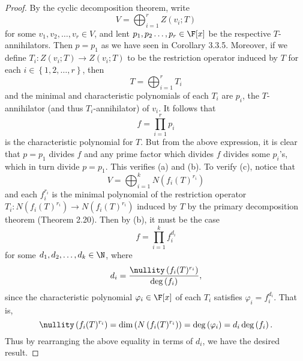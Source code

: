 \documentclass[math_245.tex]{subfiles}
\begin{document}
    \begin{proof}
        By the cyclic decomposition theorem, write
        \begin{equation*}
            V = \bigoplus^{r}_{i=1} Z(v_i;T)
        \end{equation*}
        for some $v_1,v_2,\ldots,v_r\in V$, and lent $p_1,p_2\ldots,p_r\in\F[x]$ be the respective $T$-annihilators. Then $p=p_1$ as we have seen in Corollary 3.3.5. Moreover, if we define $T_i:Z\left( v_i;T \right) \to Z\left( v_i;T \right)$ to be the restriction operator induced by $T$ for each $i\in \left\lbrace 1,2,\ldots,r \right\rbrace $, then
        \begin{equation*}
            T = \bigoplus^{r}_{i=1} T_i
        \end{equation*}
        and the minimal and characteristic polynomials of each $T_i$ are $p_i$, the $T$-annihilator (and thus $T_i$-annihilator) of $v_i$. It follows that
        \begin{equation*}
            f = \prod^{r}_{i=1} p_i
        \end{equation*}
        is the characteristic polynomial for $T$. But from the above expression, it is clear that $p=p_1$ divides $f$ and any prime factor which divides $f$ divides some $p_i$'s, which in turn divide $p=p_1$. This verifies (a) and (b). To verify (c), notice that
        \begin{equation*}
            V = \bigoplus^{k}_{i=1} N\left( f_i(T)^{r_i} \right) 
        \end{equation*}
        and each $f_i^{r_i}$ is the minimal polynomial of the restriction operator $T_i:N\left( f_i(T)^{r_i} \right) \to N\left( f_i(T)^{r_i} \right)$ induced by $T$ by the primary decomposition theorem (Theorem 2.20). Then by (b), it must be the case
        \begin{equation*}
            f = \prod^{k}_{i=1} f_i^{d_i}
        \end{equation*}
        for some $d_1,d_2,\ldots,d_k\in\N$, where
        \begin{equation*}
            d_i = \frac{\nullity\left( f_i(T)^{r_i} \right) }{\deg\left( f_i \right) },
        \end{equation*}
        since the characteristic polynomial $\varphi_i\in\F[x]$ of each $T_i$ satisfies $\varphi_i=f_i^{d_i}$. That is,
        \begin{equation*}
            \nullity\left( f_i(T)^{r_i} \right) = \dim\left( N\left( f_i(T)^{r_i} \right)  \right) = \deg\left( \varphi_i \right) = d_i\deg\left( f_i \right) .
        \end{equation*}
        Thus by rearranging the above equality in terms of $d_i$, we have the desired result.
    \end{proof}
\end{document}
